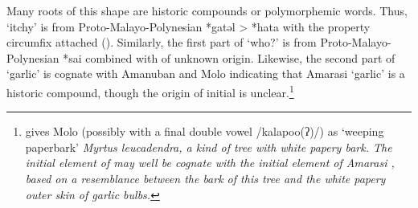 Many roots of this shape are historic compounds or polymorphemic words.
Thus,  `itchy' is from
Proto-Malayo-Polynesian *gatəl > *hata with the property
circumfix  attached ().
Similarly, the first part of  `who?'
is from Proto-Malayo-Polynesian *sai combined with  of unknown origin.
Likewise, the second part of  `garlic' is cognate
with Amanuban  and Molo  indicating that
Amarasi  `garlic' is a historic compound,
though the origin of initial  is unclear.\footnote{
		\citet[173]{mi72} gives Molo 
		(possibly with a final double vowel /kalapoo(ʔ)/)
		as `weeping paperbark' \it{Myrtus leucadendra},
		a kind of tree with white papery bark.
		The initial element of  may well
		be cognate with the initial element of Amarasi ,
		based on a resemblance between the bark of this
		tree and the white papery outer skin of garlic bulbs.}